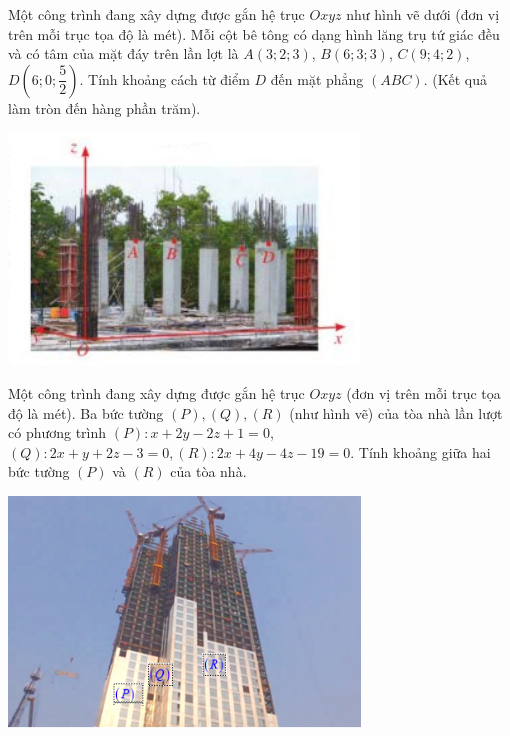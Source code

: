 \begin{ex}%
	Một công trình đang xây dựng được gắn hệ trục $Oxyz$ như hình vẽ dưới (đơn vị trên mỗi trục tọa độ là mét). Mỗi cột bê tông có dạng hình lăng trụ tứ giác đều và có tâm của mặt đáy trên lần lợt là $A(3;2;3)$, $B(6;3;3)$, $C(9;4;2)$, $D\left(6;0;\dfrac{5}{2}\right)$. Tính khoảng cách từ điểm $D$ đến mặt phẳng $(ABC)$. (Kết quả làm tròn đến hàng phần trăm).
	\begin{center}
		\includegraphics[width=0.7\textwidth]{images/C5B1CD3-H1.png}
	\end{center}
\end{ex}
\begin{ex}%
	Một công trình đang xây dựng được gắn hệ trục $Oxyz$ (đơn vị trên mỗi trục tọa độ là mét). Ba bức tường $(P),(Q),(R)$ (như hình vẽ) của tòa nhà lần lượt có phương trình $(P)\colon x+2y-2z+1=0$, $(Q)\colon 2x+y+2z-3=0,(R)\colon 2x+4y-4z-19=0$. Tính khoảng giữa hai bức tường $(P)$ và $(R)$ của tòa nhà.
	\begin{center}
		\includegraphics[width=0.7\textwidth]{images/C5B1CD3-H2.png}
	\end{center}
\end{ex}

